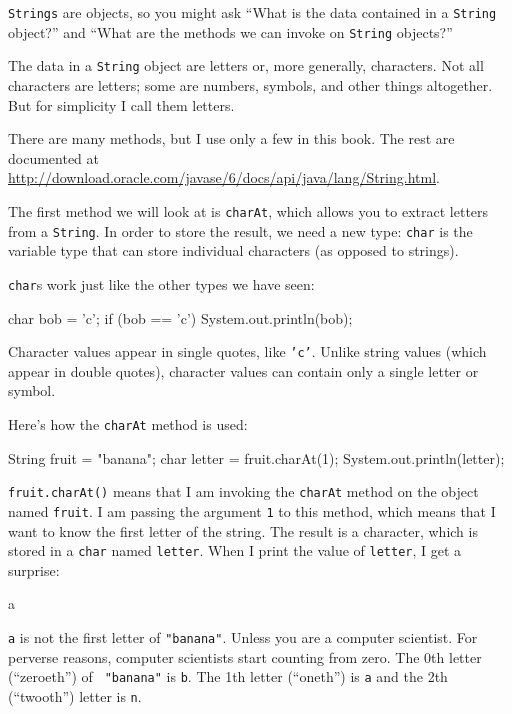 \documentclass{book}
\begin{document}
{\tt Strings} are objects,
so you might ask ``What is the data
contained in a {\tt String} object?'' and ``What are the methods we
can invoke on {\tt String} objects?''


The data in a {\tt String} object are letters or, more generally,
characters.  Not all characters are letters; some are numbers,
symbols, and other things altogether.  But for simplicity I
call them letters.

There are many methods, but I use only a few in this
book.  The rest are documented at
\url{http://download.oracle.com/javase/6/docs/api/java/lang/String.html}.

The first method we will look at is {\tt charAt}, which allows you to
extract letters from a {\tt String}.  In order to store the result, we
need a new type: {\tt char} is the variable type that can store
individual characters (as opposed to strings).


{\tt char}s work just like the other types we have seen:

\begin{verbatimtab}
    char bob = 'c';
    if (bob == 'c') {
      System.out.println(bob);
    }
\end{verbatimtab}
%
Character values appear in single quotes, like {\tt 'c'}.  Unlike
string values (which appear in double quotes), character values
can contain only a single letter or symbol.


Here's how the {\tt charAt} method is used:

\begin{verbatimtab}
    String fruit = "banana";
    char letter = fruit.charAt(1);
    System.out.println(letter);
\end{verbatimtab}
%
{\tt fruit.charAt()} means that I am 
invoking the {\tt charAt} method on the object named
{\tt fruit}.
I am passing the argument {\tt 1} to this method,
which means that I want to know the first letter of
the string.  The result is a character, which is stored in a
{\tt char} named {\tt letter}.  When I print the value of
{\tt letter}, I get a surprise:

\begin{verbatimtab}
a
\end{verbatimtab}
%
{\tt a} is not the first letter of {\tt "banana"}.  Unless you are a
computer scientist.  For perverse reasons, computer scientists
start counting from zero.  The 0th letter (``zeroeth'') of {\tt
"banana"} is {\tt b}.  The 1th letter (``oneth'') is {\tt a} and the
2th (``twooth'') letter is {\tt n}.
\end{document}
